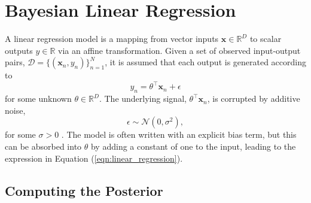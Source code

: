\documentclass[msc,deptreport.inf]{infthesis} %
\newcommand{\matr}[1]{\mathbf{#1}}
\newcommand{\R}{\mathbb R}
\begin{document}
\section{Bayesian Linear Regression}\label{sec:bayesian_lr}

A linear regression model is a mapping from vector inputs $\matr{x} \in \R^D$ to scalar outputs $y \in \R$ via an affine transformation. Given a set of observed input-output pairs, $\mathcal{D} = \{(\matr{x}_n, y_n)\}_{n=1}^{N}$, it is assumed that each output is generated according to 
\begin{equation}\label{eqn:linear_regression}
	y_n = \theta^\intercal \matr{x}_n + \epsilon
\end{equation}
for some unknown $\theta \in \R^D$. The underlying signal, $\theta^\intercal \matr{x}_n$, is corrupted by additive noise, 
\begin{equation}
	\epsilon \sim \mathcal{N}(0, \sigma^2), 
\end{equation}
for some $\sigma > 0$ \cite{barber2007}. The model is often written with an explicit bias term, but this can be absorbed into $\theta$ by adding a constant of one to the input, leading to the expression in Equation (\ref{eqn:linear_regression}).

\subsection{Computing the Posterior}
\end{document}
